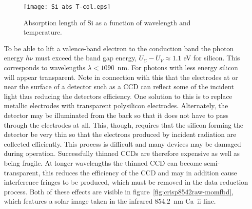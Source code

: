 \documentclass{article}
\begin{document}
\begin{figure}[h!]
	\centering
	\texttt{[image: Si\_abs\_T-col.eps]}
	\caption{Absorption length of Si as a function of wavelength and temperature.}
	\label{fig:si-abs}
\end{figure}

To be able to lift a valence-band electron to the conduction band the
photon energy $h\nu$ must exceed the band gap energy, $U_C-U_V \approx
1.1$ eV for silicon. This corresponds to wavelengths $\lambda < 1090$~nm. 
For photons with less energy silicon will appear transparent. Note in 
connection with this that the electrodes at or near the surface of a
detector such as a CCD can reflect some of the incident light thus reducing
the detectors efficiency. One solution to this is to replace 
metallic electrodes with transparent polysilicon electrodes. Alternately,
the detector may be illuminated from the back so that it does not have to
pass through the electrodes at all. This, though, requires that the silicon
forming the detector be very thin so that the electrons produced by 
incident radiation are collected efficiently. This process is difficult
and many devices may be damaged during operation. Successfully thinned
CCDs are therefore expensive as well as being fragile. At longer 
wavelengths the thinned CCD can become semi-transparent, this reduces the
efficiency of the CCD and may in addition cause interference fringes 
to be produced, which must be removed in the data reduction process. Both
of these effects are visible in figure~\ref{fig:crisp8542raw-momfbd}, which
features a solar image taken in the infrared 854.2~nm Ca~{\sc ii} line.
\end{document}
